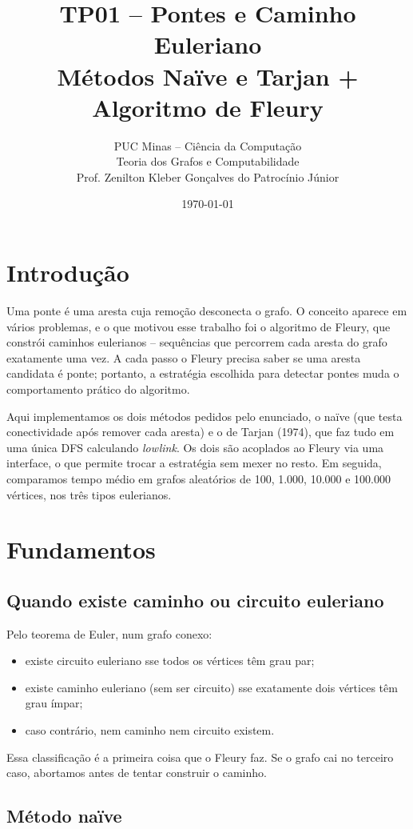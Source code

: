 \documentclass[a4paper,11pt]{article}
\title{TP01 -- Pontes e Caminho Euleriano\\
\large Métodos Naïve e Tarjan + Algoritmo de Fleury}
\author{PUC Minas -- Ciência da Computação\\
Teoria dos Grafos e Computabilidade\\
Prof. Zenilton Kleber Gonçalves do Patrocínio Júnior}
\date{\today}
\begin{document}
\maketitle

\section{Introdução}

Uma ponte é uma aresta cuja remoção desconecta o grafo. O conceito aparece em vários problemas, e o que motivou esse trabalho foi o algoritmo de Fleury, que constrói caminhos eulerianos -- sequências que percorrem cada aresta do grafo exatamente uma vez. A cada passo o Fleury precisa saber se uma aresta candidata é ponte; portanto, a estratégia escolhida para detectar pontes muda o comportamento prático do algoritmo.

Aqui implementamos os dois métodos pedidos pelo enunciado, o naïve (que testa conectividade após remover cada aresta) e o de Tarjan (1974), que faz tudo em uma única DFS calculando \textit{lowlink}. Os dois são acoplados ao Fleury via uma interface, o que permite trocar a estratégia sem mexer no resto. Em seguida, comparamos tempo médio em grafos aleatórios de 100, 1.000, 10.000 e 100.000 vértices, nos três tipos eulerianos.

\section{Fundamentos}

\subsection{Quando existe caminho ou circuito euleriano}

Pelo teorema de Euler, num grafo conexo:
\begin{itemize}
    \item existe circuito euleriano sse todos os vértices têm grau par;
    \item existe caminho euleriano (sem ser circuito) sse exatamente dois vértices têm grau ímpar;
    \item caso contrário, nem caminho nem circuito existem.
\end{itemize}

Essa classificação é a primeira coisa que o Fleury faz. Se o grafo cai no terceiro caso, abortamos antes de tentar construir o caminho.

\subsection{Método naïve}
\end{document}
